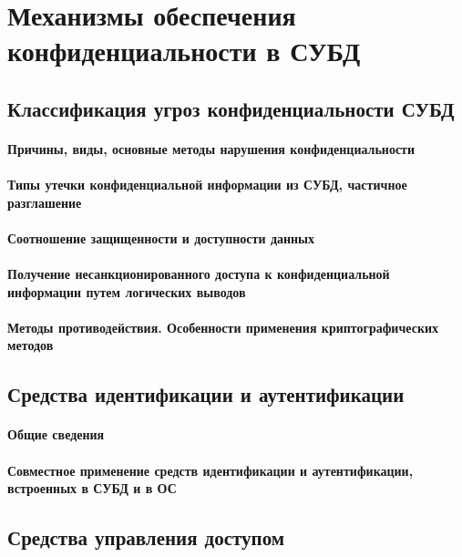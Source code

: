 \section{Механизмы обеспечения конфиденциальности в СУБД}

\subsection{Классификация угроз конфиденциальности СУБД}

\paragraph{Причины, виды, основные методы нарушения конфиденциальности}
\paragraph{Типы утечки конфиденциальной информации из СУБД, частичное разглашение}
\paragraph{Соотношение защищенности и доступности данных}
\paragraph{Получение несанкционированного доступа к конфиденциальной информации путем логических выводов}
\paragraph{Методы противодействия. Особенности применения криптографических методов}

\subsection{Средства идентификации и аутентификации}

\paragraph{Общие сведения}
\paragraph{Совместное применение средств идентификации и аутентификации, встроенных в СУБД и в ОС}

\subsection{Средства управления доступом}
